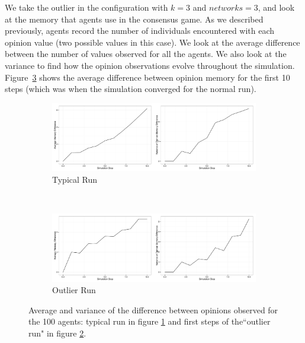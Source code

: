 \documentclass[preprint,number]{elsarticle}
\begin{document}
      \noindent We take the outlier in the configuration with $k=3$ and $networks=3$, and look at
      the memory that agents use in the consensus game. As we described previously, agents record
      the number of individuals encountered with each opinion value (two possible values in this
      case). We look at the average difference between the number of values observed for all the
      agents. We also look at the variance to find how the opinion observations evolve throughout
      the simulation. Figure~\ref{fig:ctx_perm_kreg_runs_diff} shows the average difference between
      opinion memory for the first 10 steps (which was when the simulation converged for the normal
      run).

      \begin{figure}[H]
        \centering
	\begin{subfigure}{1\linewidth}
          \centering
          \includegraphics[width=1\linewidth]{"../analysis/pdf/cp-regular-normal-run-memory-diff"}
          \caption{Typical Run}
          \label{fig:ctx_perm_kreg_run_normal_diff}
	\end{subfigure}%
	\\
	\begin{subfigure}{1\linewidth}
          \centering
          \includegraphics[width=1\linewidth]{"../analysis/pdf/cp-regular-outlier-run-memory-diff"}
          \caption{Outlier Run}
          \label{fig:ctx_perm_kreg_run_outlier_diff}
	\end{subfigure}
	
	\begin{minipage}{0.9\linewidth}
          \vspace{0.2cm}
          \caption{Average and variance of the difference between opinions observed for the 100
            agents: typical run in figure \ref{fig:ctx_perm_kreg_run_normal_diff} and first steps of
            the``outlier run" in figure \ref{fig:ctx_perm_kreg_run_outlier_diff}.}
		\label{fig:ctx_perm_kreg_runs_diff}
              \end{minipage}
      \end{figure}
\end{document}
